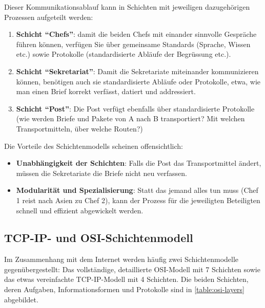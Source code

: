 Dieser Kommunikationsablauf kann in Schichten mit jeweiligen dazugehörigen Prozessen aufgeteilt werden:
\begin{enumerate}
\item \textbf{Schicht ``Chefs''}: damit die beiden Chefs mit einander sinnvolle Gespräche führen können, verfügen Sie über gemeinsame Standards (Sprache, Wissen etc.) sowie Protokolle (standardisierte Abläufe der Begrüssung etc.).
\item \textbf{Schicht ``Sekretariat''}: Damit die Sekretariate miteinander kommunizieren können, benötigen auch sie standardisierte Abläufe oder Protokolle, etwa, wie man einen Brief korrekt verfässt, datiert und addressiert.
\item \textbf{Schicht ``Post''}: Die Post verfügt ebenfalls über standardisierte Protokolle (wie werden Briefe und Pakete von A nach B transportiert? Mit welchen Transportmitteln, über welche Routen?)
\end{enumerate}
Die Vorteile des Schichtenmodells scheinen offensichtlich:
\begin{itemize}
\item \textbf{Unabhängigkeit der Schichten}: Falls die Post das Transportmittel ändert, müssen die Sekretariate die Briefe nicht neu verfassen.
\item \textbf{Modularität und Spezialisierung}: Statt das jemand alles tun muss (Chef 1 reist nach Asien zu Chef 2), kann der Prozess für die jeweiligten Beteiligten schnell und effizient abgewickelt werden.
\end{itemize}

\subsection{TCP-IP- und OSI-Schichtenmodell}

Im Zusammenhang mit dem Internet werden häufig zwei Schichtenmodelle gegenübergestellt: Das vollständige, detaillierte \acrfull{OSI}-Modell mit 7 Schichten sowie das etwas vereinfachte \acrfull{TCP}-\acrfull{IP}-Modell mit 4 Schichten. Die beiden Schichten, deren Aufgaben, Informationsformen und Protokolle sind in \cref{table:osi-layers} abgebildet.


